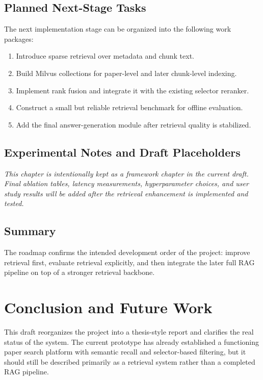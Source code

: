 \documentclass[11pt,a4paper,oneside]{report}
\newcommand{\draftnote}[1]{\textit{#1}}
\begin{document}
\section{Planned Next-Stage Tasks}

The next implementation stage can be organized into the following work packages:

\begin{enumerate}
  \item Introduce sparse retrieval over metadata and chunk text.
  \item Build Milvus collections for paper-level and later chunk-level indexing.
  \item Implement rank fusion and integrate it with the existing selector reranker.
  \item Construct a small but reliable retrieval benchmark for offline evaluation.
  \item Add the final answer-generation module after retrieval quality is stabilized.
\end{enumerate}

\section{Experimental Notes and Draft Placeholders}

\draftnote{This chapter is intentionally kept as a framework chapter in the current
draft. Final ablation tables, latency measurements, hyperparameter choices, and user
study results will be added after the retrieval enhancement is implemented and tested.}

\section{Summary}

The roadmap confirms the intended development order of the project: improve retrieval
first, evaluate retrieval explicitly, and then integrate the later full RAG pipeline
on top of a stronger retrieval backbone.

\chapter{Conclusion and Future Work}

This draft reorganizes the project into a thesis-style report and clarifies the real
status of the system. The current prototype has already established a functioning
paper search platform with semantic recall and selector-based filtering, but it should
still be described primarily as a retrieval system rather than a completed RAG
pipeline.
\end{document}
